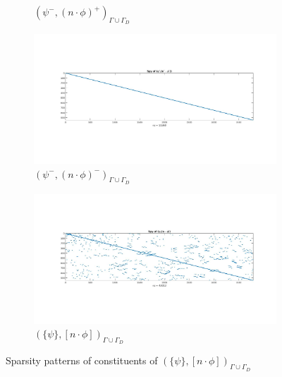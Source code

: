 \documentclass[a4paper,openany]{book}
\begin{document}
\begin{figure}
\begin{subfigure}{0.5\textwidth}
  \caption{$( \psi^- ,(n \cdot \phi)^+)_{\Gamma \cup \Gamma_D}$}
  \label{fig:figure43}
  \end{subfigure}
    \begin{subfigure}{0.5\textwidth}
    \includegraphics[width=\linewidth]{figure44.jpg}
  \caption{$( \psi^- ,(n \cdot \phi)^-)_{\Gamma \cup \Gamma_D}$}
  \label{fig:figure44}
  \end{subfigure}
  \begin{subfigure}{\textwidth}	
\centering
  \includegraphics[width=\linewidth]{figure4.jpg}
  \caption{$(\lbrace \psi \rbrace ,[n \cdot \phi])_{\Gamma \cup \Gamma_D}$}
  \label{fig:figure4}
\end{subfigure}
\caption{Sparsity patterns of constituents of $(\lbrace \psi  \rbrace,[n \cdot \phi])_{\Gamma \cup \Gamma_D}$}
\label{figure_4_all}
\end{figure}
\end{document}

